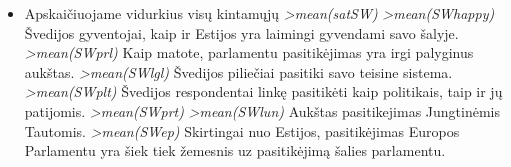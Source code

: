 \documentclass[12pt,a4paper]{article}
\theoremstyle{change}\newtheorem{salyga}{Uždavinys}
\begin{document}
\begin{itemize}
\item Apskaičiuojame vidurkius visų kintamųjų
\newline \textit{ >mean(satSW) 
   }
\newline \textit{ >mean(SWhappy) 
   }
\newline Švedijos gyventojai, kaip ir Estijos yra laimingi gyvendami savo šalyje.
\newline \textit{ >mean(SWprl) 
   }
\newline Kaip matote, parlamentu pasitikėjimas yra irgi palyginus aukštas.
\newline \textit{ >mean(SWlgl) 
   }
\newline Švedijos piliečiai pasitiki savo teisine sistema.
\newline \textit{ >mean(SWplt) 
   }
\newline Švedijos respondentai linkę pasitikėti kaip politikais, taip ir jų patijomis.
\newline \textit{ >mean(SWprt) 
   }
\newline \textit{ >mean(SWlun) 
   }
\newline Aukštas pasitikejimas Jungtinėmis Tautomis.
\newline \textit{ >mean(SWep) 
  }
\newline Skirtingai nuo Estijos, pasitikėjimas Europos Parlamentu yra šiek tiek žemesnis uz pasitikėjimą šalies parlamentu.


\end{itemize}
\end{document}
